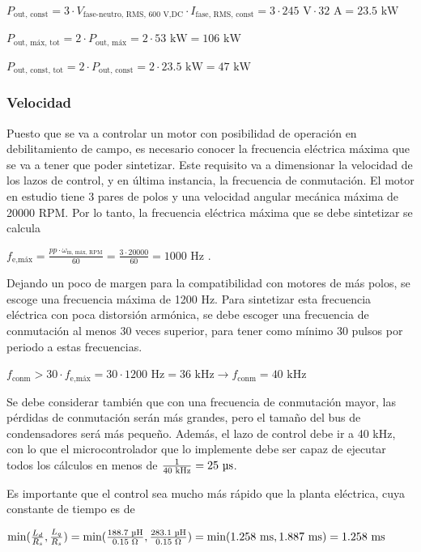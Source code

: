 \(P_{\text{out, const}} = 3\cdot V_{\text{fase-neutro, RMS, 600 V,DC}}\cdot I_{\text{fase, RMS, const}} = 3\cdot245 \text{ V}\cdot 32 \text{ A} = 23.5 \text{ kW}\)

\(P_{\text{out, máx, tot}} = 2\cdot P_{\text{out, máx}} = 2\cdot53 \text{ kW} = 106 \text{ kW}\)

\(P_{\text{out, const, tot}} = 2\cdot P_{\text{out, const}} = 2\cdot23.5 \text{ kW} = 47 \text{ kW}\)


\subsubsection{Velocidad}
Puesto que se va a controlar un motor con posibilidad de operación en debilitamiento de campo, es necesario conocer la frecuencia eléctrica máxima que se va a tener que poder sintetizar. Este requisito va a dimensionar la velocidad de los lazos de control, y en última instancia, la frecuencia de conmutación. El motor en estudio tiene 3 pares de polos y una velocidad angular mecánica máxima de 20000 RPM. Por lo tanto, la frecuencia eléctrica máxima que se debe sintetizar se calcula

\(f_{\text{e,máx}} = \frac{pp\cdot \omega_{\text{m, máx, RPM}}}{60} = \frac{3\cdot 20000}{60} = 1000 \text{ Hz .}\)

Dejando un poco de margen para la compatibilidad con motores de más polos, se escoge una frecuencia máxima de 1200 Hz. Para sintetizar esta frecuencia eléctrica con poca distorsión armónica, se debe escoger una frecuencia de conmutación al menos 30 veces superior, para tener como mínimo 30 pulsos por periodo a estas frecuencias.

\(f_{\text{conm}} > 30\cdot f_{\text{e,máx}} = 30\cdot1200 \text{ Hz} = 36 \text{ kHz} \rightarrow f_{\text{conm}} = 40 \text{ kHz}\)

Se debe considerar también que con una frecuencia de conmutación mayor, las pérdidas de conmutación serán más grandes, pero el tamaño del bus de condensadores será más pequeño. Además, el lazo de control debe ir a 40 kHz, con lo que el microcontrolador que lo implemente debe ser capaz de ejecutar todos los cálculos en menos de $\frac{1}{40 \text{ kHz}} = 25 \text{ }\text{\unit{\micro\second}}$.

Es importante que el control sea mucho más rápido que la planta eléctrica, cuya constante de tiempo es de

\(\text{min}(\frac{L_d}{R_s},\frac{L_q}{R_s}) = \text{min}(\frac{188.7 \text{ }\text{\unit{\micro\henry}}}{0.15 \text{ }\Omega},\frac{283.1 \text{ }\text{\unit{\micro\henry}}}{0.15 \text{ }\Omega}) = \text{min}(1.258 \text{ ms}, 1.887 \text{ ms}) = 1.258 \text{ ms}\)

